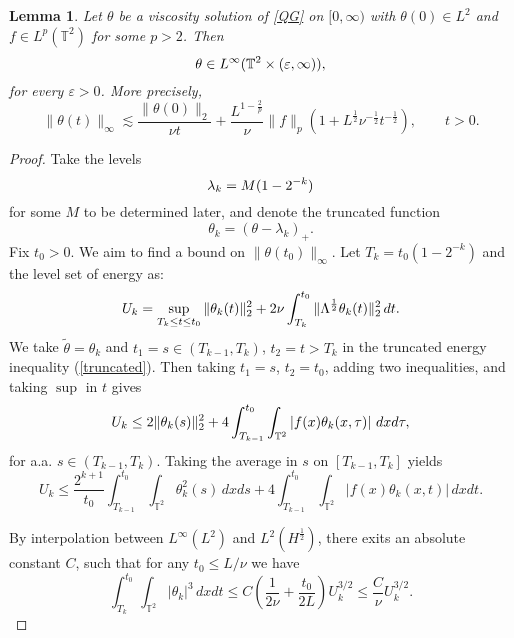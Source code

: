 \documentclass{amsart}
\numberwithin{Theorem}{section}
\newtheorem {Lemma}[Theorem]  {Lemma}
\theoremstyle{definition}
\theoremstyle{remark}
\renewcommand{\th}{\theta}
\begin{document}
\begin{Lemma}
\label{Linfty}
Let $\theta$ be a viscosity solution of \eqref{QG} on $[0,\infty)$ with $\th(0) \in L^2$ and $f\in L^p(\mathbb T^2)$ for some $p>2$. Then
\begin{equation}\notag
\th \in L^{\infty}({\mathbb T}^2 \times (\varepsilon,\infty) ),
\end{equation}
for every $\varepsilon>0$. More precisely,
\[
\|\theta(t)\|_\infty \lesssim \frac{\|\theta(0)\|_2}{\nu t} + \frac{L^{1-\frac2p}}{\nu} \|f\|_p(1+L^{\frac12}\nu^{-\frac12} t^{-\frac12}), \qquad t>0.
\]
\end{Lemma}
\begin{proof} Take the levels 
\begin{equation}\notag
\lambda_k=M(1-2^{-k})
\end{equation}
for some $M$ to be determined later,
and denote the truncated function 
\[
\theta_k=(\theta-\lambda_k)_+.
\]
Fix $t_0>0$. 
We aim to find a bound on $\|\theta(t_0)\|_{\infty}$. 
Let $T_k=t_0(1-2^{-k})$ and 
the level set of energy as:
\begin{equation}\notag
U_k=\sup_{T_k\leq t \leq t_0}\|\theta_k(t)\|_2^2+2\nu\int_{T_k}^{t_0}\|\Lambda^{\frac{1}{2}}\theta_k(t)\|_2^2 \,dt.
\end{equation}
We take $\tilde\theta=\theta_k$ and $t_1=s \in(T_{k-1},T_k)$, $t_2=t>T_k$ in the truncated energy inequality (\ref{truncated}).
Then taking $t_1=s$, $t_2=t_0$, adding two inequalities, and taking $\sup$ in $t$ gives 
\begin{equation}\notag
U_k\leq 2\|\theta_k(s)\|_2^2+4\int_{T_{k-1}}^{t_0} \int_{\mathbb T^2}\left|f(x) \theta_k(x,\tau)\right|\, dxd\tau,
\end{equation}
for a.a. $s \in (T_{k-1}, T_k)$.
Taking the average in $s$ on $[T_{k-1}, T_k]$ yields
\begin{equation}\label{truncated1}
U_k\leq \frac{2^{k+1}}{t_0}\int_{T_{k-1}}^{t_0}\int_{\mathbb T^2} \theta_k^2(s)\,dxds+4\int_{T_{k-1}}^{t_0}\int_{\mathbb T^2}\left|f(x) \theta_k(x,t)\right|\, dxdt.
\end{equation}

By interpolation between $L^\infty(L^2)$ and $L^2(H^{\frac{1}{2}})$, there
exits an absolute constant $C$, such that for any $t_0 \leq L/\nu$ we have
\begin{equation}\label{interpolation}
\int_{T_{k}}^{t_0}\int_{\mathbb T^2} |\theta_{k}|^3\,dxdt \leq 
 C\left(\frac{1}{2\nu}
+\frac{t_0}{2L}\right) U_k^{3/2} \leq \frac{C}{\nu} U_k^{3/2}.
\end{equation}


\end{proof}
\end{document}
